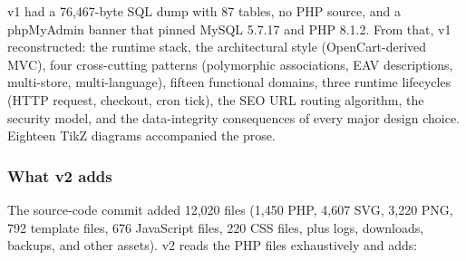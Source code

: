 \documentclass[11pt,a4paper]{article}
\begin{document}
v1 had a 76,467-byte SQL dump with 87 tables, no PHP source, and a
phpMyAdmin banner that pinned MySQL 5.7.17 and PHP 8.1.2. From that,
v1 reconstructed: the runtime stack, the architectural style
(OpenCart-derived MVC), four cross-cutting patterns (polymorphic
associations, EAV descriptions, multi-store, multi-language),
fifteen functional domains, three runtime lifecycles (HTTP request,
checkout, cron tick), the SEO URL routing algorithm, the security
model, and the data-integrity consequences of every major design
choice. Eighteen TikZ diagrams accompanied the prose.

\subsubsection{What v2 adds}

The source-code commit added 12,020 files (1,450 PHP, 4,607 SVG,
3,220 PNG, 792 template files, 676 JavaScript files, 220 CSS files,
plus logs, downloads, backups, and other assets). v2 reads the PHP
files exhaustively and adds:
\end{document}
